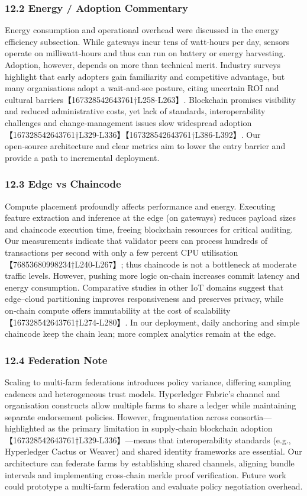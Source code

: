 \documentclass[12pt,onecolumn]{IEEEtran} %
\begin{document}
\subsubsection*{12.2 Energy / Adoption Commentary}
Energy consumption and operational overhead were discussed in the energy efficiency subsection.  While gateways incur tens of watt‑hours per day, sensors operate on milliwatt‑hours and thus can run on battery or energy harvesting.  Adoption, however, depends on more than technical merit.  Industry surveys highlight that early adopters gain familiarity and competitive advantage, but many organisations adopt a wait‑and‑see posture, citing uncertain ROI and cultural barriers【167328542643761†L258-L263】.  Blockchain promises visibility and reduced administrative costs, yet lack of standards, interoperability challenges and change‑management issues slow widespread adoption【167328542643761†L329-L336】【167328542643761†L386-L392】.  Our open‑source architecture and clear metrics aim to lower the entry barrier and provide a path to incremental deployment.

\subsubsection*{12.3 Edge vs Chaincode}
Compute placement profoundly affects performance and energy.  Executing feature extraction and inference at the edge (on gateways) reduces payload sizes and chaincode execution time, freeing blockchain resources for critical auditing.  Our measurements indicate that validator peers can process hundreds of transactions per second with only a few percent CPU utilisation【76853680998234†L240-L267】; thus chaincode is not a bottleneck at moderate traffic levels.  However, pushing more logic on‑chain increases commit latency and energy consumption.  Comparative studies in other IoT domains suggest that edge–cloud partitioning improves responsiveness and preserves privacy, while on‑chain compute offers immutability at the cost of scalability【167328542643761†L274-L280】.  In our deployment, daily anchoring and simple chaincode keep the chain lean; more complex analytics remain at the edge.

\subsubsection*{12.4 Federation Note}
Scaling to multi‑farm federations introduces policy variance, differing sampling cadences and heterogeneous trust models.  Hyperledger Fabric’s channel and organisation constructs allow multiple farms to share a ledger while maintaining separate endorsement policies.  However, fragmentation across consortia—highlighted as the primary limitation in supply‑chain blockchain adoption【167328542643761†L329-L336】—means that interoperability standards (e.g., Hyperledger Cactus or Weaver) and shared identity frameworks are essential.  Our architecture can federate farms by establishing shared channels, aligning bundle intervals and implementing cross‑chain merkle proof verification.  Future work could prototype a multi‑farm federation and evaluate policy negotiation overhead.
\end{document}
